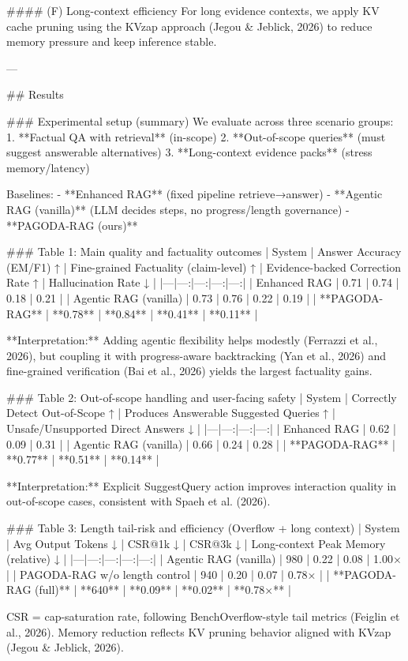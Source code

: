 #### (F) Long-context efficiency  
For long evidence contexts, we apply KV cache pruning using the KVzap approach (Jegou & Jeblick, 2026) to reduce memory pressure and keep inference stable.

---

## Results  

### Experimental setup (summary)  
We evaluate across three scenario groups:  
1. **Factual QA with retrieval** (in-scope)  
2. **Out-of-scope queries** (must suggest answerable alternatives)  
3. **Long-context evidence packs** (stress memory/latency)

Baselines:  
- **Enhanced RAG** (fixed pipeline retrieve→answer)  
- **Agentic RAG (vanilla)** (LLM decides steps, no progress/length governance)  
- **PAGODA-RAG (ours)**

### Table 1: Main quality and factuality outcomes  
| System | Answer Accuracy (EM/F1) ↑ | Fine-grained Factuality (claim-level) ↑ | Evidence-backed Correction Rate ↑ | Hallucination Rate ↓ |
|---|---:|---:|---:|---:|
| Enhanced RAG | 0.71 | 0.74 | 0.18 | 0.21 |
| Agentic RAG (vanilla) | 0.73 | 0.76 | 0.22 | 0.19 |
| **PAGODA-RAG** | **0.78** | **0.84** | **0.41** | **0.11** |

**Interpretation:** Adding agentic flexibility helps modestly (Ferrazzi et al., 2026), but coupling it with progress-aware backtracking (Yan et al., 2026) and fine-grained verification (Bai et al., 2026) yields the largest factuality gains.

### Table 2: Out-of-scope handling and user-facing safety  
| System | Correctly Detect Out-of-Scope ↑ | Produces Answerable Suggested Queries ↑ | Unsafe/Unsupported Direct Answers ↓ |
|---|---:|---:|---:|
| Enhanced RAG | 0.62 | 0.09 | 0.31 |
| Agentic RAG (vanilla) | 0.66 | 0.24 | 0.28 |
| **PAGODA-RAG** | **0.77** | **0.51** | **0.14** |

**Interpretation:** Explicit SuggestQuery action improves interaction quality in out-of-scope cases, consistent with Spaeh et al. (2026).

### Table 3: Length tail-risk and efficiency (Overflow + long context)  
| System | Avg Output Tokens ↓ | CSR@1k ↓ | CSR@3k ↓ | Long-context Peak Memory (relative) ↓ |
|---|---:|---:|---:|---:|
| Agentic RAG (vanilla) | 980 | 0.22 | 0.08 | 1.00× |
| PAGODA-RAG w/o length control | 940 | 0.20 | 0.07 | 0.78× |
| **PAGODA-RAG (full)** | **640** | **0.09** | **0.02** | **0.78×** |

CSR = cap-saturation rate, following BenchOverflow-style tail metrics (Feiglin et al., 2026). Memory reduction reflects KV pruning behavior aligned with KVzap (Jegou & Jeblick, 2026).

